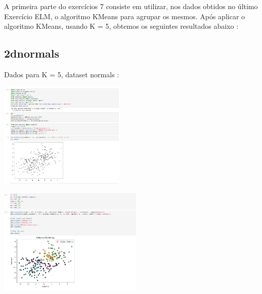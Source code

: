 \documentclass{article}
\begin{document}
\vspace{20pt}

A primeira parte do exercícios 7 consiste em utilizar, nos dados obtidos no último Exercício ELM, o algoritmo KMeans para agrupar os mesmos. Após aplicar o algoritmo KMeans, usando K = 5, obtemos os seguintes resultados abaixo : 

\vspace{10pt}




\subsection{2dnormals}

\vspace{10pt}

Dados para K = 5, dataset normals : 

\vspace{10pt}

\begin{center}

\includegraphics[height=2in]{normals_gen.png}
    
\end{center}

\vspace{10pt}

\begin{center}

\includegraphics[height=2in]{normals_cluster.png}
        
\end{center}
\end{document}

